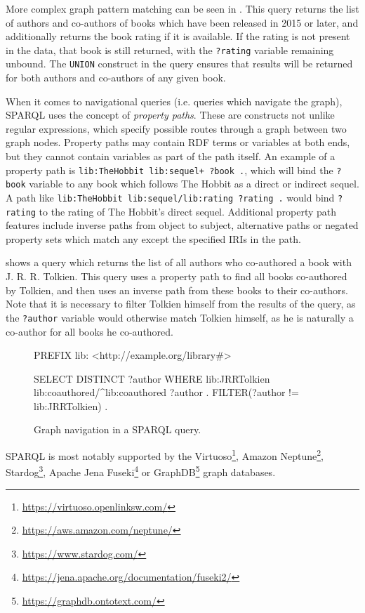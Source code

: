 More complex graph pattern matching can be seen in .
This query returns the list of authors and co-authors of books which have been released in  2015 or later, and additionally returns the book rating if it is available.
If the rating is not present in the data, that book is still returned, with the \texttt{?rating} variable remaining unbound.
The \texttt{UNION} construct in the query ensures that results will be returned for both authors and co-authors of any given book.

When it comes to navigational queries (i.e. queries which navigate the graph), SPARQL uses the concept of \textit{property paths}.
These are constructs not unlike regular expressions, which specify possible routes through a graph between two graph nodes.
Property paths may contain RDF terms or variables at both ends, but they cannot contain variables as part of the path itself.
An example of a property path is \texttt{lib:TheHobbit lib:sequel+ ?book .}, which will bind the \texttt{?book} variable to any book which follows The Hobbit as a direct or indirect sequel.
A path like \texttt{lib:TheHobbit lib:sequel/lib:rating ?rating .} would bind \texttt{?rating} to the rating of The Hobbit's direct sequel.
Additional property path features include inverse paths from object to subject, alternative paths or negated property sets which match any except the specified IRIs in the path.

 shows a query which returns the list of all authors who co-authored a book with J. R. R. Tolkien.
This query uses a property path to find all books co-authored by Tolkien, and then uses an inverse path from these books to their co-authors.
Note that it is necessary to filter Tolkien himself from the results of the query, as the \texttt{?author} variable would otherwise match Tolkien himself, as he is naturally a co-author for all books he co-authored.

\begin{figure}[ht]
\begin{code}[]
PREFIX lib: <http://example.org/library#>

SELECT DISTINCT ?author
WHERE
{
    lib:JRRTolkien lib:coauthored/^lib:coauthored ?author .
    FILTER(?author != lib:JRRTolkien) .
}
\end{code}
\caption{Graph navigation in a SPARQL query.}
\label{fig:sparqlnav}
\end{figure}

SPARQL is most notably supported by the Virtuoso\footnote{\url{https://virtuoso.openlinksw.com/}}, Amazon Neptune\footnote{\url{https://aws.amazon.com/neptune/}}, Stardog\footnote{\url{https://www.stardog.com/}}, Apache Jena Fuseki\footnote{\url{https://jena.apache.org/documentation/fuseki2/}} or GraphDB\footnote{\url{https://graphdb.ontotext.com/}} graph databases.

